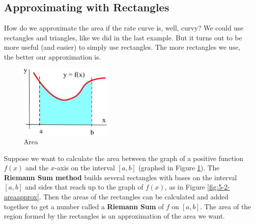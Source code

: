 \subsection{Approximating with Rectangles}
How do we approximate the area if the rate curve is, well, curvy? We could use rectangles and triangles, like we did in the last example. But it turns out to be more useful (and easier) to simply use rectangles. The more rectangles we use, the better our approximation is.

\begin{figure}[!ht]
  \centering
    \includegraphics[width=0.4\textwidth]{img/chap5/image005.png}
    \caption{Area}
    \label{fig:5-2-area}
\end{figure}
Suppose we want to calculate the area between the graph of a positive function $f(x)$ and the $x$-axis on the interval $[a,b]$ (graphed in Figure \ref{fig:5-2-area}). The {\bf Riemann Sum method} builds several rectangles with bases on the interval $[a,b]$ and sides that reach up to the graph of $f(x)$, as in Figure \ref{fig:5-2-areaapprox}. Then the areas of the rectangles can be calculated and added together to get a number called a {\bf Riemann Sum} of $f$ on $[a,b]$. The area of the region formed by the rectangles is an approximation of the area we want.

